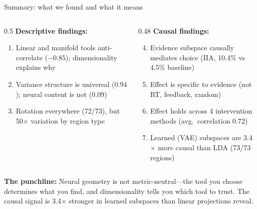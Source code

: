 \documentclass[aspectratio=169,11pt]{beamer}
\begin{document}
\begin{frame}{Summary: what we found and what it means}
\begin{columns}[T]
\begin{column}{0.5\textwidth}
\textbf{Descriptive findings:}
\begin{enumerate}
  \item Linear and manifold tools anti-correlate ($-0.85$); dimensionality explains why
  \item Variance structure is universal ($0.94$); neural content is not ($0.09$)
  \item Rotation everywhere (72/73), but 50$\times$ variation by region type
\end{enumerate}
\end{column}
\begin{column}{0.48\textwidth}
\textbf{Causal findings:}
\begin{enumerate}
  \setcounter{enumi}{3}
  \item Evidence subspace causally mediates choice (IIA, 10.4\% vs 4.5\% baseline)
  \item Effect is specific to evidence (not RT, feedback, random)
  \item Effect holds across 4 intervention methods (avg.\ correlation $0.72$)
  \item Learned (VAE) subspaces are 3.4$\times$ more causal than LDA (73/73 regions)
\end{enumerate}
\end{column}
\end{columns}

\vspace{0.5em}
{\small \textbf{The punchline:} Neural geometry is not metric-neutral---the tool you choose determines what you find, and dimensionality tells you which tool to trust. The causal signal is 3.4$\times$ stronger in learned subspaces than linear projections reveal.}
\end{frame}


\begin{frame}[plain]
\vfill
\begin{center}
  \setlength{\fboxrule}{2.5pt}%
\end{center}
\vfill
\end{frame}
\end{document}
